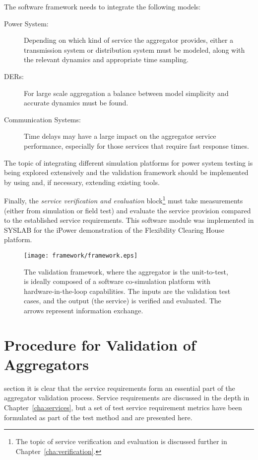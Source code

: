 The software framework needs to integrate the following models:
\begin{description}
	\item[Power System:] Depending on which kind of service the aggregator provides, either a transmission system or distribution system must be modeled, along with the relevant dynamics and appropriate time sampling.
	\item[DERs:] For large scale aggregation a balance between model simplicity and accurate dynamics must be found.
	\item[Communication Systems:] Time delays may have a large impact on the aggregator service performance, especially for those services that require fast response times.
\end{description}

The topic of integrating different simulation platforms for power system testing is being explored extensively and the validation framework should be implemented by using and, if necessary, extending existing tools.

Finally, the \emph{service verification and evaluation} block\footnote{The topic of service verification and evaluation is discussed further in Chapter~\ref{cha:verification}.} must take measurements (either from simulation or field test) and evaluate the service provision compared to the established service requirements. This software module was implemented in SYSLAB for the iPower demonstration of the Flexibility Clearing House platform.

\begin{figure}[ht]
	\centering
	\caption{The validation framework, where the aggregator is the unit-to-test, is ideally composed of a software co-simulation platform with hardware-in-the-loop capabilities. The inputs are the validation test cases, and the output (\ie the service) is verified and evaluated. The arrows represent information exchange.}
	\texttt{[image: framework/framework.eps]}\label{fig:frameworkbig}
\end{figure}
\section{Procedure for Validation of Aggregators} 
 section it is clear that the service requirements form an essential part of the aggregator validation process. Service requirements are discussed in the depth in Chapter~\ref{cha:services}, but a set of test service requirement metrics have been formulated as part of the test method and are presented here.

